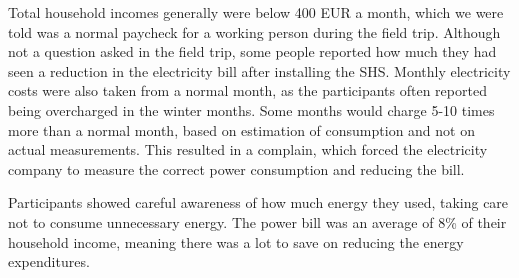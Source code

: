 Total household incomes generally were below 400 EUR a month, which we were told was a normal paycheck for a working person during the field trip. Although not a question asked in the field trip, some people reported how much they had seen a reduction in the electricity bill after installing the SHS. Monthly electricity costs were also taken from a normal month, as the participants often reported being overcharged in the winter months. Some months would charge 5-10 times more than a normal month, based on estimation of consumption and not on actual measurements. This resulted in a complain, which forced the electricity company to measure the correct power consumption and reducing the bill.

Participants showed careful awareness of how much energy they used, taking care not to consume unnecessary energy. The power bill was an average of 8\% of their household income, meaning there was a lot to save on reducing the energy expenditures.

